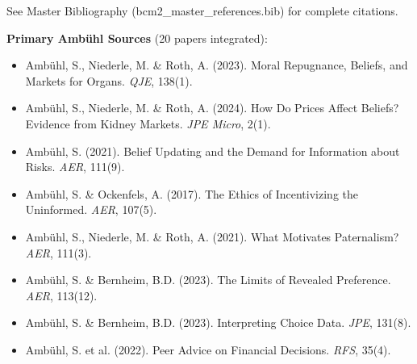 See Master Bibliography (bcm2\_master\_references.bib) for complete citations.

\nocite{bcm_master}

\textbf{Primary Ambühl Sources} (20 papers integrated):

\begin{itemize}
    \item Ambühl, S., Niederle, M. \& Roth, A. (2023). Moral Repugnance, Beliefs, and Markets for Organs. \textit{QJE}, 138(1).
    \item Ambühl, S., Niederle, M. \& Roth, A. (2024). How Do Prices Affect Beliefs? Evidence from Kidney Markets. \textit{JPE Micro}, 2(1).
    \item Ambühl, S. (2021). Belief Updating and the Demand for Information about Risks. \textit{AER}, 111(9).
    \item Ambühl, S. \& Ockenfels, A. (2017). The Ethics of Incentivizing the Uninformed. \textit{AER}, 107(5).
    \item Ambühl, S., Niederle, M. \& Roth, A. (2021). What Motivates Paternalism? \textit{AER}, 111(3).
    \item Ambühl, S. \& Bernheim, B.D. (2023). The Limits of Revealed Preference. \textit{AER}, 113(12).
    \item Ambühl, S. \& Bernheim, B.D. (2023). Interpreting Choice Data. \textit{JPE}, 131(8).
    \item Ambühl, S. et al. (2022). Peer Advice on Financial Decisions. \textit{RFS}, 35(4).
\end{itemize}



